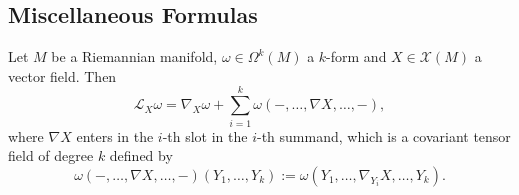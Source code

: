 \subsection{Miscellaneous Formulas}

\begin{lemma}
    \label{cartan_calc:lem:relation_between_Lie_derivative_and_connection}
    Let $M$ be a Riemannian manifold, $\omega \in \Omega^k(M)$ a $k$-form and $X \in \mathscr{X}(M)$ a vector field. Then
    \[
    \mathcal{L}_X \omega = \nabla_X \omega + \sum_{i=1}^{k} \omega(-,\ldots,\nabla X,\ldots,-),
    \] 
    where $\nabla X$ enters in the $i$-th slot in the $i$-th summand, which is a covariant tensor field of degree $k$ defined by 
    \[
    \omega(-,\ldots,\nabla X,\ldots,-)(Y_1,\ldots,Y_k) := \omega(Y_1,\ldots,\nabla_{Y_i} X,\ldots,Y_k).
    \] 
\end{lemma}

